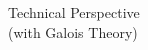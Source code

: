 \documentclass[preview]{standalone}
\begin{document}
\begin{center}
Technical Perspective \\ (with Galois Theory)
\end{center}
\end{document}
